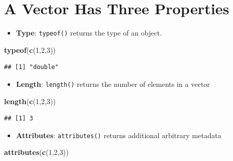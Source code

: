 \documentclass[]{book}
\newenvironment{Shaded}{\begin{snugshade}}{\end{snugshade}}
\newcommand{\KeywordTok}[1]{\textcolor[rgb]{0.13,0.29,0.53}{\textbf{{#1}}}}
\newcommand{\DecValTok}[1]{\textcolor[rgb]{0.00,0.00,0.81}{{#1}}}
\newcommand{\NormalTok}[1]{{#1}}
\providecommand{\tightlist}{%
  \setlength{\itemsep}{0pt}\setlength{\parskip}{0pt}}
\begin{document}
\section{A Vector Has Three
Properties}\label{a-vector-has-three-properties}

\begin{itemize}
\tightlist
\item
  \textbf{Type}: \texttt{typeof()} returns the type of an object.
\end{itemize}

\begin{Shaded}
\begin{Highlighting}[]
\KeywordTok{typeof}\NormalTok{(}\KeywordTok{c}\NormalTok{(}\DecValTok{1}\NormalTok{,}\DecValTok{2}\NormalTok{,}\DecValTok{3}\NormalTok{))}
\end{Highlighting}
\end{Shaded}

\begin{verbatim}
## [1] "double"
\end{verbatim}

\begin{itemize}
\tightlist
\item
  \textbf{Length}: \texttt{length()} returns the number of elements in a
  vector
\end{itemize}

\begin{Shaded}
\begin{Highlighting}[]
\KeywordTok{length}\NormalTok{(}\KeywordTok{c}\NormalTok{(}\DecValTok{1}\NormalTok{,}\DecValTok{2}\NormalTok{,}\DecValTok{3}\NormalTok{))}
\end{Highlighting}
\end{Shaded}

\begin{verbatim}
## [1] 3
\end{verbatim}

\begin{itemize}
\tightlist
\item
  \textbf{Attributes}: \texttt{attributes()} returns additional
  arbitrary metadata
\end{itemize}

\begin{Shaded}
\begin{Highlighting}[]
\KeywordTok{attributes}\NormalTok{(}\KeywordTok{c}\NormalTok{(}\DecValTok{1}\NormalTok{,}\DecValTok{2}\NormalTok{,}\DecValTok{3}\NormalTok{))}
\end{Highlighting}
\end{Shaded}
\end{document}
